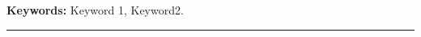 \begin{vcenterpage}

{\large\textbf{Keywords:}}
Keyword 1, Keyword2.\\

\noindent\rule[2pt]{\textwidth}{0.5pt}
\end{vcenterpage}